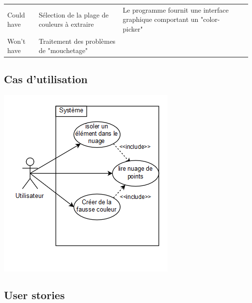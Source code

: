 \documentclass[12pt,titlepage,french]{article}
\begin{document}
\noindent\begin{tabu} to \toprule
     &&&\\\toprule
Could have
& Sélection de la plage de couleurs à extraire 
& Le programme fournit une interface graphique comportant un "color-picker"
& \\\midrule
Won't have
& Traitement des problèmes de "mouchetage"
& 
&\\\bottomrule
\end{tabu}

\subsection*{Cas d'utilisation}

\begin{center}
    \includegraphics{usecase.PNG}
\end{center}

\subsection*{User stories}
\end{document}
